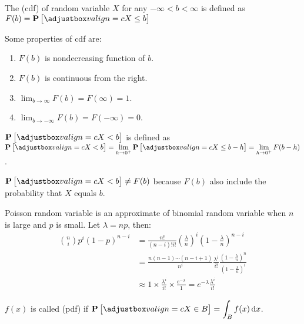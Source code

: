 \begin{definition}[cdf]
    The  (cdf) of random variable $X$ for any $- \infty < b < \infty$ is defined as $F(b) = \probability{ X \leq b }$
\end{definition}

\begin{theorem}
    Some properties of cdf are:
    \begin{enumerate}
        \item $F(b)$ is nondecreasing function of $b$.
        \item $F(b)$ is continuous from the right.
        \item $\lim_{b \rightarrow \infty} F(b) = F(\infty) = 1$.
        \item $\lim_{b \rightarrow -\infty} F(b) = F(- \infty) = 0$.
    \end{enumerate}
\end{theorem}

\begin{definition}
    $\probability{X < b}$ is defined as $\probability{ X < b } = \displaystyle \lim_{h \rightarrow 0^+} \probability{ X \leq b - h } = \lim_{h \rightarrow 0^+} F(b-h)$.
\end{definition}

$\probability{X < b} \neq F(b)$ because $F(b)$ also include the probability that $X$ equals $b$.




Poisson random variable is an approximate of binomial random variable when $n$ is large and $p$ is small. Let $\lambda = np$, then:
\begin{equation*}
    \begin{aligned}
        \binom{n}{i}p^i (1-p)^{n-i} &= \frac{n!}{(n-i)! i!} \left(\frac{\lambda}{n} \right)^i \left(1-\frac{\lambda}{n} \right)^{n-i} \\
        &= \frac{n (n-1) \cdots (n - i + 1)}{n^i} \frac{\lambda^i}{i!} \frac{(1- \frac{\lambda}{n})^n}{(1- \frac{\lambda}{n})^i} \\
        & \approx 1 \times \frac{\lambda^i}{i!} \times \frac{e^{- \lambda}}{1} = e^{- \lambda} \frac{\lambda^i}{ i !}
    \end{aligned}
\end{equation*}

\begin{definition}
    $f(x)$ is called  (pdf) if $\probability{X \in B} = {\displaystyle \int_B f(x) \dif{x}} $.
\end{definition}

